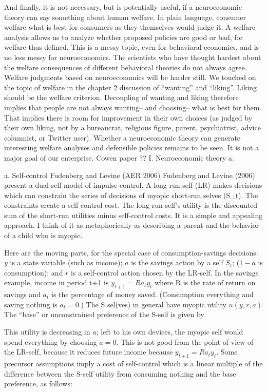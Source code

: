 \documentclass{article}
\begin{document}
And finally, it is not necessary, but is potentially useful, if a neuroeconomic theory can say something about human welfare. In plain language, consumer welfare what is best for consumers as they themselves would judge it. A welfare analysis allows us to analyze whether proposed policies are good or bad, for welfare thus defined. This is a messy topic, even for behavioral economics, and is no less messy for neuroeconomics. The scientists who have thought hardest about the welfare consequences of different behavioral theories do not always agree. Welfare judgments based on neuroeconomics will be harder still. 
We touched on the topic of welfare in the chapter 2 discussion of “wanting” and “liking”. Liking should be the welfare criterion. Decoupling of wanting and liking therefore implies that people are not always wanting-- and choosing-- what is best for them. That implies there is room for improvement in their own choices (as judged by their own liking, not by a bureaucrat, religious figure, parent, psychiatrist, advice columnist, or Twitter user). Whether a neuroeconomic theory can generate interesting welfare analyses and defensible policies remains to be seen. It is not a major goal of our enterprise. 
Cowen paper ??
I.	Neuroeconomic theory 
a.	






a.	Self-control
Fudenberg and Levine (AER 2006) 
Fudenberg and Levine (2006) present a dual-self model of impulse control. A long-run self (LR) makes decisions which can constrain the series of  decisions of myopic  short-run selves (S\_t). The constraints create a self-control cost. The long-run self’s utility is the discounted sum of the short-run utilities minus self-control costs. 
It is a simple and appealing approach. I think of it as metaphorically as describing a parent and the behavior of a child who is myopic. 


Here are the moving parts, for the special case of consumption-savings decisions: $y$ is a state variable (such as income); $a$ is the savings action by a self $S_t$; ($1-a$ is consumption); and $r$ is a self-control action chosen by the LR-self. In the savings example, income in period t+1 is $y_{t+1}=Ra_ty_t$ where R is the rate of return on savings and $a_t$ is the percentage of money saved. (Consumption everything and saving nothing is $a_t=0.$) 
The S sel(ves) in general have myopic utility $u(y,r,a)$ The “base” or unconstrained preference of the S-self is given by 
 
This utility is decreasing in $a$; left to his own devices, the myopic self would spend everything by choosing $a=0$. This is not good from the point of view of the LR-self, because it reduces future income because $y_{t+1}=Ra_ty_t$.
Some precursor assumptions imply a cost of self-control which is a linear multiple of the difference between the S-self utility from consuming nothing and the base preference, as follows:
 
\end{document}
